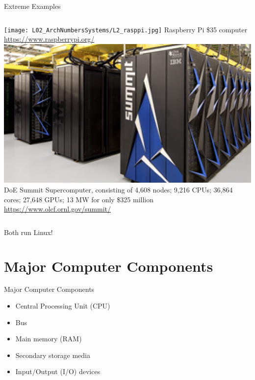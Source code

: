 \documentclass[graphics]{beamer}
\begin{document}
\begin{frame}{Extreme Examples}
    \begin{columns}
            \texttt{[image: L02\_ArchNumbersSystems/L2\_rasppi.jpg]}
            Raspberry Pi \$35 computer
            \footnotesize
            \url{https://www.raspberrypi.org/}
            \includegraphics[scale=0.4]{L02_ArchNumbersSystems/L2_summit.png}
            DoE Summit Supercomputer, consisting of 4,608 nodes; 9,216 CPUs; 36,864 cores; 27,648 GPUs; 13 MW for only \$325 million
            \footnotesize
            \url{https://www.olcf.ornl.gov/summit/}
    \end{columns}
    \footnotesize Both run Linux!
\end{frame}

\section{Major Computer Components}
\begin{frame}{Major Computer Components}
    \begin{itemize}
        \item Central Processing Unit (CPU)
        \item Bus
        \item Main memory (RAM)
        \item Secondary storage media
        \item Input/Output (I/O) devices
    \end{itemize}
\end{frame}
\end{document}

